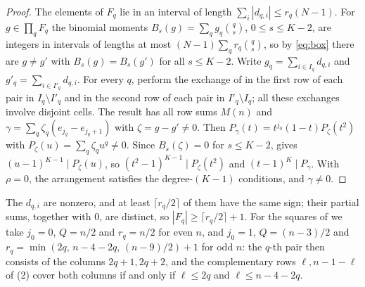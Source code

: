 \begin{proof}
The elements of $F_q$ lie in an interval of length $\sum_i|d_{q,i}|\le r_q(N-1)$.
For $g\in\prod_qF_q$ the binomial moments $B_s(g)=\sum_qg_q\binom qs$, $0\le s\le K-2$, are integers in intervals of lengths at most $(N-1)\sum_qr_q\binom qs$, so by \eqref{eq:box} there are $g\ne g'$ with $B_s(g)=B_s(g')$ for all $s\le K-2$.
Write $g_q=\sum_{i\in I_q}d_{q,i}$ and $g'_q=\sum_{i\in I'_q}d_{q,i}$.
For every $q$, perform the exchange of  in the first row of each pair in $I_q\setminus I'_q$ and in the second row of each pair in $I'_q\setminus I_q$; all these exchanges involve disjoint cells.
The result has all row sums $M(n)$ and $\gamma=\sum_q \zeta_q(e_{j_q}-e_{j_q+1})$ with $\zeta=g-g'\ne0$.
Then $P_\gamma(t)=t^{j_0}(1-t)P_\zeta(t^2)$ with $P_\zeta(u)=\sum_q\zeta_qu^q\ne0$.
Since $B_s(\zeta)=0$ for $s\le K-2$,  gives $(u-1)^{K-1}\mid P_\zeta(u)$, so $(t^2-1)^{K-1}\mid P_\zeta(t^2)$ and $(t-1)^{K}\mid P_\gamma$.
With $\rho=0$, the arrangement satisfies the degree-$(K-1)$ conditions, and $\gamma\ne0$.
\end{proof}

The $d_{q,i}$ are nonzero, and at least $\lceil r_q/2\rceil$ of them have the same sign; their partial sums, together with $0$, are distinct, so $|F_q|\ge\lceil r_q/2\rceil+1$.
For the squares of  we take $j_0=0$, $Q=n/2$ and $r_q=n/2$ for even $n$, and $j_0=1$, $Q=(n-3)/2$ and $r_q=\min(2q,\,n-4-2q,\,(n-9)/2)+1$ for odd $n$: the $q$-th pair then consists of the columns $2q+1,2q+2$, and the complementary rows $\ell,n-1-\ell$ of (2) cover both columns if and only if $\ell\le2q$ and $\ell\le n-4-2q$.

